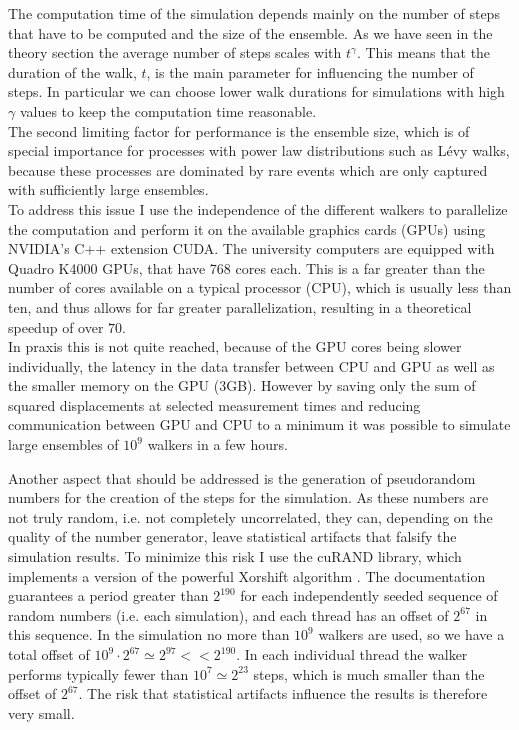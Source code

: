 The computation time of the simulation depends mainly on the number of steps that have to be computed and the size of the ensemble. As we have seen in the theory section the average number of steps scales with $t^{\gamma}$. This means that the duration of the walk, $t$, is the main parameter for influencing the number of steps. In particular we can choose lower walk durations for simulations with high $\gamma$ values to keep the computation time reasonable.\\
The second limiting factor for performance is the ensemble size, which is of special importance for processes with power law distributions such as L\'evy walks, because these processes are dominated by rare events which are only captured with sufficiently large ensembles. \\
To address this issue I use the independence of the different walkers to parallelize the computation and perform it on the available graphics cards (GPUs) using NVIDIA's C++ extension CUDA. The university computers are equipped with Quadro K4000 GPUs, that have 768 cores each. This is a far greater than the number of cores available on a typical processor (CPU), which is usually less than ten, and thus allows for far greater parallelization, resulting in a theoretical speedup of over $70$. \\
In praxis this is not quite reached, because of the GPU cores being slower individually, the latency in the data transfer between CPU and GPU as well as the smaller memory on the GPU (3GB). However by saving only the sum of squared displacements at selected measurement times and reducing communication between GPU and CPU to a minimum it was possible to simulate large ensembles of $10^9$ walkers in a few hours. 

Another aspect that should be addressed is the generation of pseudorandom numbers for the creation of the steps for the simulation. As these numbers are not truly random, i.e. not completely uncorrelated, they can, depending on the quality of the number generator, leave statistical artifacts that falsify the simulation results. To minimize this risk I use the cuRAND library, which implements a version of the powerful Xorshift algorithm 
\cite{marsaglia2003xorshift}. 
The documentation guarantees a period greater than $2^{190}$ for each independently seeded sequence of random numbers (i.e. each simulation), and each thread has an offset of $2^{67}$ in this sequence. In the simulation no more than $10^{9}$ walkers are used, so we have a total offset of $10^9 \cdot 2^{67}  \simeq 2^{97} << 2^{190}$. In each individual thread the walker performs typically fewer than $10^{7} \simeq 2^{23}$ steps, which is much smaller than the offset of $2^{67}$. The risk that statistical artifacts influence the results is therefore very small.


